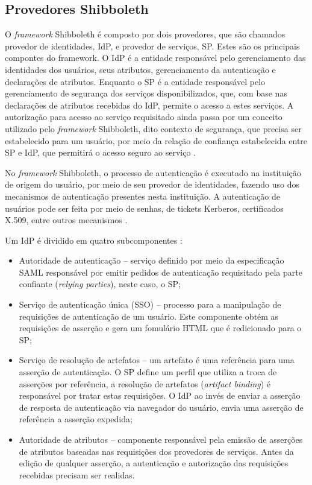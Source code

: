 \subsection{Provedores Shibboleth}
\label{s_c2_provedores}

O \textit{framework} Shibboleth é composto por dois provedores, que são chamados provedor de identidades, \acf{IdP}, e provedor de serviços, \acf{SP}. Estes são os principais compontes do framework. O IdP é a entidade responsável pelo gerenciamento das identidades dos usuários, seus atributos, gerenciamento da autenticação e declarações de atributos. Enquanto o SP é a entidade responsável pelo gerenciamento de segurança dos serviços disponibilizados, que, com base nas declarações de atributos recebidas do IdP, permite o acesso a estes serviços. A autorização para acesso ao serviço requisitado ainda passa por um conceito utilizado pelo \textit{framework} Shibboleth, dito contexto de segurança, que precisa ser estabelecido para um usuário, por meio da relação de confiança estabelecida entre SP e IdP, que permitirá o acesso seguro ao serviço \cite{kallela:08}.

No \textit{framework} Shibboleth, o processo de autenticação é executado na instituição de origem do usuário, por meio de seu provedor de identidades, fazendo uso dos mecanismos de autenticação presentes nesta instituição. A autenticação de usuários pode ser feita por meio de senhas, de tickets Kerberos, certificados X.509, entre outros mecanismos \cite{chadwick:09, wangham:10b}.

Um IdP é dividido em quatro subcomponentes \cite{scavo:05}:

\begin{itemize}
 \item Autoridade de autenticação -- serviço definido por meio da especificação SAML responsável por emitir pedidos de autenticação requisitado pela parte confiante (\textit{relying parties}), neste caso, o SP;
 \item Serviço de autenticação única (SSO) -- processo para a manipulação de requisições de autenticação de um usuário. Este componente obtém as requisições de asserção e gera um fomulário HTML que é redicionado para o SP;
 \item Serviço de resolução de artefatos -- um artefato é uma referência para uma asserção de autenticação. O SP define um perfil que utiliza a troca de asserções por referência, a resolução de artefatos (\textit{artifact binding}) é responsável por tratar estas requisições. O IdP ao invés de enviar a asserção de resposta de autenticação via navegador do usuário, envia uma asserção de referência a asserção expedida;
 \item Autoridade de atributos -- componente responsável pela emissão de asserções de atributos baseadas nas requisições dos provedores de serviços. Antes da edição de qualquer asserção, a autenticação e autorização das requisições recebidas precisam ser realidas.
\end{itemize}

